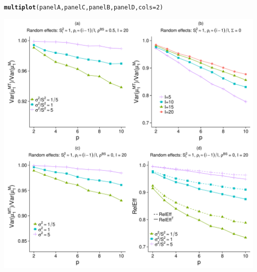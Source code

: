 \documentclass{article}\usepackage[]{graphicx}\usepackage[]{color}
\makeatletter
\def\maxwidth{ %
  \ifdim\Gin@nat@width>\linewidth
    \linewidth
  \else
    \Gin@nat@width
  \fi
}
\newcommand{\hlnum}[1]{\textcolor[rgb]{0.686,0.059,0.569}{#1}}%
\newcommand{\hlstd}[1]{\textcolor[rgb]{0.345,0.345,0.345}{#1}}%
\newcommand{\hlkwc}[1]{\textcolor[rgb]{0.333,0.667,0.333}{#1}}%
\newcommand{\hlkwd}[1]{\textcolor[rgb]{0.737,0.353,0.396}{\textbf{#1}}}%
\newenvironment{kframe}{%
 \def\at@end@of@kframe{}%
 \ifinner\ifhmode%
  \def\at@end@of@kframe{\end{minipage}}%
  \begin{minipage}{\columnwidth}%
 \fi\fi%
 \def\FrameCommand##1{\hskip\@totalleftmargin \hskip-\fboxsep
 \colorbox{shadecolor}{##1}\hskip-\fboxsep
     \hskip-\linewidth \hskip-\@totalleftmargin \hskip\columnwidth}%
 \MakeFramed {\advance\hsize-\width
   \@totalleftmargin\z@ \linewidth\hsize
   \@setminipage}}%
 {\par\unskip\endMakeFramed%
 \at@end@of@kframe}
\newenvironment{knitrout}{}{} %
\makeatother
\begin{document}
\begin{knitrout}
\color{fgcolor}\begin{kframe}
\begin{alltt}
\hlkwd{multiplot}\hlstd{(panelA, panelC, panelB, panelD,} \hlkwc{cols}\hlstd{=}\hlnum{2}\hlstd{)}
\end{alltt}


{\ttfamily\noindent\itshape\color{messagecolor}{\#\# Loading required package: grid}}\end{kframe}

{\centering \includegraphics[width=\maxwidth]{figures/Figure_S3_panels_abcd-1} 

}



\end{knitrout}
\end{document}
